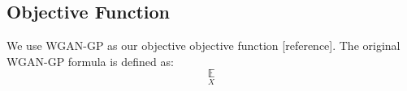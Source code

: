 \subsection{Objective Function}
We use WGAN-GP as our objective objective function [reference]. The original WGAN-GP formula is defined as:
\begin{equation}
\underset{X}{\mathbb{E}}
\end{equation}